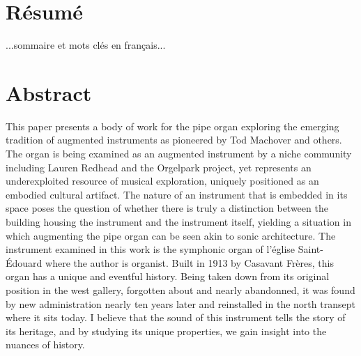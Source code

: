 \documentclass[12pt,twoside,maitrise]{dms}
\theoremstyle{definition}
\numberwithin{equation}{section}
\numberwithin{table}{chapter}
\numberwithin{figure}{chapter}
\begin{document}
\maketitle

\maketitle


\francais

\chapter*{Résumé}

...sommaire et mots clés en français...


\anglais

\chapter*{Abstract}

This paper presents a body of work for the pipe organ exploring the emerging tradition of augmented instruments as pioneered by Tod Machover and others. 
The organ is being examined as an augmented instrument by a niche community including Lauren Redhead and the Orgelpark project, yet represents an underexploited resource of musical exploration, uniquely positioned as an embodied cultural artifact. 
The nature of an instrument that is embedded in its space poses the question of whether there is truly a distinction between the building housing the instrument and the instrument itself, yielding a situation in which augmenting the pipe organ can be seen akin to sonic architecture. 
The instrument examined in this work is the symphonic organ of l'église Saint-Édouard where the author is organist. 
Built in 1913 by Casavant Frères, this organ has a unique and eventful history. 
Being taken down from its original position in the west gallery, forgotten about and nearly abandonned, it was found by new administration nearly ten years later and reinstalled in the north transept where it sits today. 
I believe that the sound of this instrument tells the story of its heritage, and by studying its unique properties, we gain insight into the nuances of history. 
\end{document}
